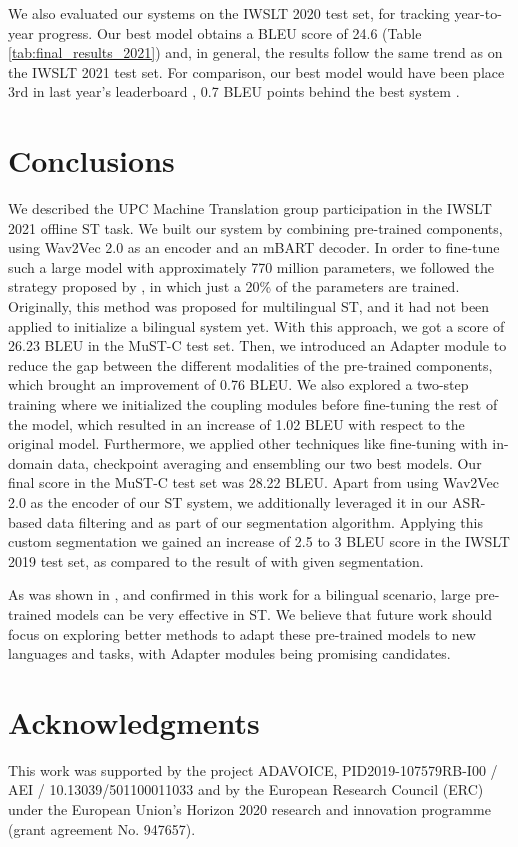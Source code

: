 \documentclass[11pt,a4paper]{article}
\begin{document}
        We also evaluated our systems on the IWSLT 2020 test set, for tracking year-to-year progress. Our best model obtains a BLEU score of 24.6 (Table \ref{tab:final_results_2021}) and, in general, the results follow the same trend as on the IWSLT 2021 test set. For comparison, our best model would have been place 3rd in last year's leaderboard \cite{iwslt2020}, 0.7 BLEU points behind the best system \cite{best_iwslt2020}.


\section{Conclusions}
    We described the UPC Machine Translation group participation in the IWSLT 2021 offline ST task. We built our system by combining pre-trained components, using Wav2Vec 2.0 as an encoder and an mBART decoder. In order to fine-tune such a large model with approximately 770 million parameters, we followed the strategy proposed by \citet{lna}, in which just a 20\% of the parameters are trained. Originally, this method was proposed for multilingual ST, and it had not been applied to initialize a bilingual system yet. With this approach, we got a score of 26.23 BLEU in the MuST-C test set. Then, we introduced an Adapter module to reduce the gap between the different modalities of the pre-trained components, which brought an improvement of 0.76 BLEU. We also explored a two-step training where we initialized the coupling modules before fine-tuning the rest of the model, which resulted in an increase of 1.02 BLEU with respect to the original model. Furthermore, we applied other techniques like fine-tuning with in-domain data, checkpoint averaging and ensembling our two best models. Our final score in the MuST-C test set was 28.22 BLEU. Apart from using Wav2Vec 2.0 as the encoder of our ST system, we additionally leveraged it in our ASR-based data filtering and as part of our segmentation algorithm. Applying this custom segmentation we gained an increase of 2.5 to 3 BLEU score in the IWSLT 2019 test set, as compared to the result of with given segmentation.
    
    As was shown in \citet{lna}, and confirmed in this work for a bilingual scenario, large pre-trained models can be very effective in ST. We believe that future work should focus on exploring better methods to adapt these pre-trained models to new languages and tasks, with Adapter modules being promising candidates.

\section*{Acknowledgments}

This work was supported by the project ADAVOICE, PID2019-107579RB-I00 / AEI / 10.13039/501100011033 and by the European Research Council (ERC) under the European Union’s Horizon 2020 research and innovation programme (grant agreement No. 947657).



\end{document}
